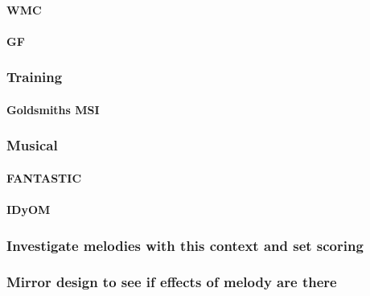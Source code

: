 \documentclass[]{book}
\let\oldparagraph\paragraph
\renewcommand{\paragraph}[1]{\oldparagraph{#1}\mbox{}}
\theoremstyle{definition}
\theoremstyle{definition}
\theoremstyle{definition}
\theoremstyle{remark}
\begin{document}
\hypertarget{wmc}{%
\paragraph{WMC}\label{wmc}}

\hypertarget{gf}{%
\paragraph{GF}\label{gf}}

\hypertarget{training}{%
\subsubsection{Training}\label{training}}

\hypertarget{goldsmiths-msi}{%
\paragraph{Goldsmiths MSI}\label{goldsmiths-msi}}

\hypertarget{musical}{%
\subsubsection{Musical}\label{musical}}

\hypertarget{fantastic-1}{%
\paragraph{FANTASTIC}\label{fantastic-1}}

\hypertarget{idyom}{%
\paragraph{IDyOM}\label{idyom}}

\hypertarget{investigate-melodies-with-this-context-and-set-scoring}{%
\subsubsection{Investigate melodies with this context and set
scoring}\label{investigate-melodies-with-this-context-and-set-scoring}}

\hypertarget{mirror-design-to-see-if-effects-of-melody-are-there}{%
\subsubsection{Mirror design to see if effects of melody are
there}\label{mirror-design-to-see-if-effects-of-melody-are-there}}
\end{document}
